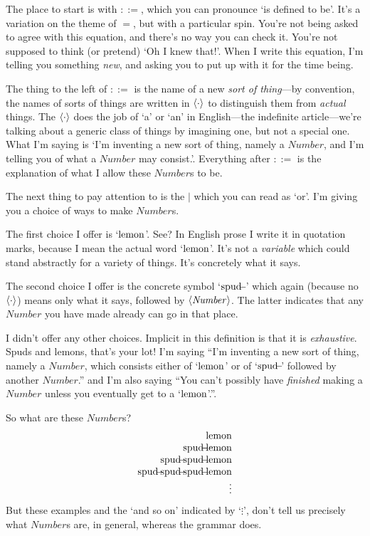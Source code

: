 \documentclass{book}
\begin{document}
The place to start is with $::=$, which you can pronounce `is defined to be'. It's a variation on the theme of $=$, but with a particular spin. You're not being asked to agree with this equation, and there's no way you can check it. You're not supposed to think (or pretend) `Oh I knew that!'. When I write this equation, I'm telling you something \emph{new}, and asking you to put up with it for the time being.

The thing to the left of $::=$ is the name of a new \emph{sort of thing}---by convention, the names of sorts of things are written in $\langle\mathit{\cdot}\rangle$ to distinguish them from \emph{actual} things. The $\langle\mathit{\cdot}\rangle$ does the job of `a' or `an' in English---the indefinite article---we're talking about a generic class of things by imagining one, but not a special one. What I'm saying is `I'm inventing a new sort of thing, namely a $\mathit{Number}$, and I'm telling you of what a $\mathit{Number}$ may consist.'. Everything after $::=$ is the explanation of what I allow these $\mathit{Number}$s to be.

The next thing to pay attention to is the $|$ which you can read as `or'. I'm giving you a choice of ways to make $\mathit{Number}$s.

The first choice I offer is `$\mbox{lemon}$'. See? In English prose I write it in quotation marks, because I mean the actual word `$\mbox{lemon}$'. It's not a \emph{variable} which could stand abstractly for a variety of things. It's concretely what it says.

The second choice I offer is the concrete symbol `$\mbox{spud}\!\!\!-\!\!\!{\,}$' which again (because no $\langle\mathit{\cdot}\rangle$) means only what it says, followed by $\langle\mathit{Number}\rangle$. The latter indicates that any $\mathit{Number}$ you have made already can go in that place.

I didn't offer any other choices. Implicit in this definition is that it is \emph{exhaustive}. Spuds and lemons, that's your lot! I'm saying ``I'm inventing a new sort of thing, namely a $\mathit{Number}$, which consists either of `$\mbox{lemon}$' or of `$\mbox{spud}\!\!\!-\!\!\!{}$' followed by another $\mathit{Number}$.'' and I'm also saying ``You can't possibly have \emph{finished} making a $\mathit{Number}$ unless you eventually get to a `$\mbox{lemon}$'.''.

So what are these $\mathit{Number}$s?
\[\begin{array}{r}
\lemon \\
\spud\lemon \\
\spud\spud\lemon \\
\spud\spud\spud\lemon \\
\vdots
\end{array}\]
But these examples and the `and so on' indicated by `$\vdots$', don't tell us precisely what $\mathit{Number}$s are, in general, whereas the grammar does.
\end{document}
